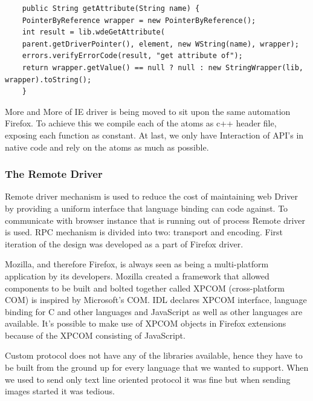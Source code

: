\documentclass[article,type=msc,colorback,accentcolor=tud9c,twoside,11pt]{tudthesis}
\begin{document}
	\begin{lstlisting}
	public String getAttribute(String name) {
	PointerByReference wrapper = new PointerByReference();
	int result = lib.wdeGetAttribute(
	parent.getDriverPointer(), element, new WString(name), wrapper);
	errors.verifyErrorCode(result, "get attribute of");
	return wrapper.getValue() == null ? null : new StringWrapper(lib, wrapper).toString();
	}
	\end{lstlisting}
	
	More and More of IE driver is being moved to sit upon the same automation Firefox. To achieve this we compile each of the atoms as c++ header file, exposing each function as constant. At last, we only have Interaction of API's in native code and rely on the atoms as much as possible.
	\subsubsection{The Remote Driver}
	Remote driver mechanism is used to reduce the cost of maintaining web Driver by providing a uniform interface that language binding can code against. To communicate with browser instance that is running out of process Remote driver is used. RPC mechanism is divided into two: transport and encoding. First iteration of the design was developed as a part of Firefox driver.
	
	Mozilla, and therefore Firefox, is always seen as being a multi-platform application by its developers. Mozilla created a framework that allowed components to be built and bolted together called XPCOM (cross-platform COM) is inspired by Microsoft's COM.  IDL declares XPCOM interface, language binding for C and other languages and JavaScript as well as other languages are available. It's possible to make use of XPCOM objects in Firefox extensions because of the XPCOM consisting of JavaScript.
	
	Custom protocol does not have any of the libraries available, hence they have to be built from the ground up for every language that we wanted to support. When we used to send only text line oriented protocol it was fine but when sending images started it was tedious.
	
\end{document}

